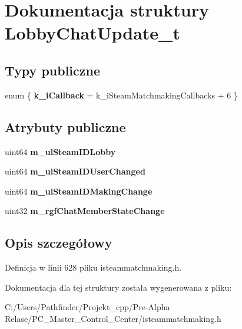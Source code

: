 \hypertarget{struct_lobby_chat_update__t}{}\section{Dokumentacja struktury Lobby\+Chat\+Update\+\_\+t}
\label{struct_lobby_chat_update__t}
\subsection*{Typy publiczne}
\begin{DoxyCompactItemize}
\item 
\mbox{\label{struct_lobby_chat_update__t_ac417fe62f333f399a9e9cd43e3df6848}} 
enum \{ {\bfseries k\+\_\+i\+Callback} = k\+\_\+i\+Steam\+Matchmaking\+Callbacks + 6
 \}
\end{DoxyCompactItemize}
\subsection*{Atrybuty publiczne}
\begin{DoxyCompactItemize}
\item 
\mbox{\label{struct_lobby_chat_update__t_a4be7b82a5e5e2c35d17c6e80973fe4e9}} 
uint64 {\bfseries m\+\_\+ul\+Steam\+I\+D\+Lobby}
\item 
\mbox{\label{struct_lobby_chat_update__t_a4848bc41e96a111828415b58d4fe965e}} 
uint64 {\bfseries m\+\_\+ul\+Steam\+I\+D\+User\+Changed}
\item 
\mbox{\label{struct_lobby_chat_update__t_a73daa7411f3a610080a3b37b6b63ac40}} 
uint64 {\bfseries m\+\_\+ul\+Steam\+I\+D\+Making\+Change}
\item 
\mbox{\label{struct_lobby_chat_update__t_a351c645035e4ed95f9d2e542728036cd}} 
uint32 {\bfseries m\+\_\+rgf\+Chat\+Member\+State\+Change}
\end{DoxyCompactItemize}


\subsection{Opis szczegółowy}


Definicja w linii 628 pliku isteammatchmaking.\+h.



Dokumentacja dla tej struktury została wygenerowana z pliku\+:\begin{DoxyCompactItemize}
\item 
C\+:/\+Users/\+Pathfinder/\+Projekt\+\_\+cpp/\+Pre-\/\+Alpha Relase/\+P\+C\+\_\+\+Master\+\_\+\+Control\+\_\+\+Center/isteammatchmaking.\+h\end{DoxyCompactItemize}
